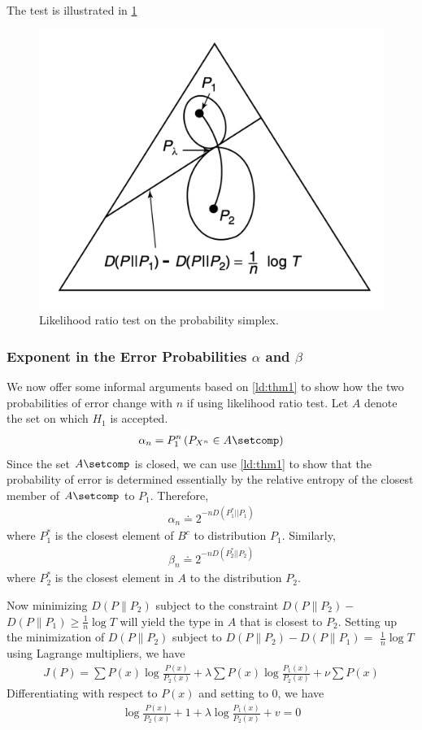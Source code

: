 \documentclass{article}
\begin{document}
The test is illustrated in \cref{ht:fig1}

\begin{figure}[ht]
 \centering
 \includegraphics[width=0.5\linewidth]{Figs/fig6.png}
\centering
\caption{Likelihood ratio test on the probability simplex.}
		\label{ht:fig1}
\end{figure}

\subsubsection{Exponent in the Error Probabilities $\alpha$ and $\beta$}\label{ht:sssect2_1}
We now offer some informal arguments based on \cref{ld:thm1} to show how the two probabilities of error change with $n$ if using likelihood ratio test. Let $A$ denote the set on which $H_1$ is accepted. 
\begin{align*}
\alpha_{n}=P_{1}^{n}\left(P_{X^{n}} \in A\setcomp\right)
\end{align*}
Since the set $A\setcomp$ is closed, we can use \cref{ld:thm1} to show that the probability of error is determined essentially by the relative entropy of the closest member of $A\setcomp$ to $P_{1}$. Therefore,
\begin{align*}
\alpha_{n} \doteq 2^{-n D\left(P_{1}^{*}|| P_{1}\right)}
\end{align*}
where $P_{1}^{*}$ is the closest element of $B^{c}$ to distribution $P_{1} .$ Similarly,
\begin{align*}
\beta_{n} \doteq 2^{-n D\left(P_{2}^{*}|| P_{2}\right)}
\end{align*}
where $P_{2}^{*}$ is the closest element in $A$ to the distribution $P_{2}$. 


Now minimizing $D\left(P \| P_{2}\right)$ subject to the constraint $D\left(P \| P_{2}\right)-$ $D\left(P \| P_{1}\right) \geq \frac{1}{n} \log T$ will yield the type in $A$ that is closest to $P_{2} .$ Setting up the minimization of $D\left(P \| P_{2}\right)$ subject to $D\left(P \| P_{2}\right)-D\left(P \| P_{1}\right)=$ $\frac{1}{n} \log T$ using Lagrange multipliers, we have
\begin{align*}
J(P)=\sum P(x) \log \frac{P(x)}{P_{2}(x)}+\lambda \sum P(x) \log \frac{P_{1}(x)}{P_{2}(x)}+\nu \sum P(x)
\end{align*}
Differentiating with respect to $P(x)$ and setting to 0, we have
\begin{align*}
\log \frac{P(x)}{P_{2}(x)}+1+\lambda \log \frac{P_{1}(x)}{P_{2}(x)}+v=0
\end{align*}
\end{document}
